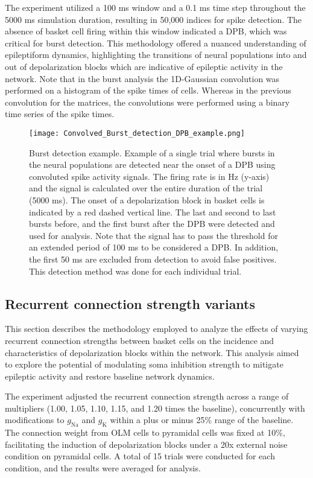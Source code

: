 \noindent The experiment utilized a 100 ms window and a 0.1 ms time step throughout the 5000 ms simulation duration, resulting in 50,000 indices for spike detection.
The absence of basket cell firing within this window indicated a DPB, which was critical for burst detection.
This methodology offered a nuanced understanding of epileptiform dynamics, highlighting the transitions of neural populations into and out of depolarization blocks which are indicative of epileptic activity in the network.
Note that in the burst analysis the 1D-Gaussian convolution was performed on a histogram of the spike times of cells. Whereas in the previous convolution for the matrices, the convolutions were performed using a binary time series of the spike times.

\begin{figure}[htbp]
    \centering
    \texttt{[image: Convolved\_Burst\_detection\_DPB\_example.png]}
    \caption[Burst detection example]{Burst detection example. Example of a single trial where bursts in the neural populations are detected near the onset of a DPB using convoluted spike activity signals. The firing rate is in Hz (y-axis) and the signal is calculated over the entire duration of the trial (5000 ms).
        The onset of a depolarization block in basket cells is indicated by a red dashed vertical line. The last and second to last bursts before, and the first burst after the DPB were detected and used for analysis.
        Note that the signal has to pass the threshold for an extended period of 100 ms to be considered a DPB\@.
        In addition, the first 50 ms are excluded from detection to avoid false positives. This detection method was done for each individual trial.}\label{fig:example_burst_detection}
\end{figure}
\pagebreak

\subsection{Recurrent connection strength variants}
This section describes the methodology employed to analyze the effects of
varying recurrent connection strengths between basket cells on the incidence
and characteristics of depolarization blocks within the network. This analysis
aimed to explore the potential of modulating soma inhibition strength to
mitigate epileptic activity and restore baseline network dynamics.

The experiment adjusted the recurrent connection strength across a range of
multipliers (1.00, 1.05, 1.10, 1.15, and 1.20 times the baseline), concurrently
with modifications to \(g_{\text{Na}}\) and \(g_{\text{K}}\) within a plus or
minus 25\% range of the baseline. The connection weight from OLM cells to
pyramidal cells was fixed at 10\%, facilitating the induction of depolarization
blocks under a 20x external noise condition on pyramidal cells. A total of 15
trials were conducted for each condition, and the results were averaged for
analysis.

